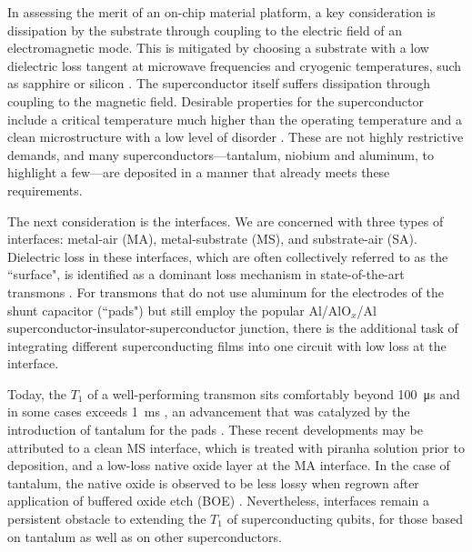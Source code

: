 \documentclass[
    reprint,
    superscriptaddress,
    amsmath,amssymb,
    aps,
    prb,
    floatfix,
]{revtex4-2}
\begin{document}
In assessing the merit of an on-chip material platform, a key consideration is dissipation by the substrate through coupling to the electric field of an electromagnetic mode. This is mitigated by choosing a substrate with a low dielectric loss tangent at microwave frequencies and cryogenic temperatures, such as sapphire \cite{creedon2011,read2023,ganjam2024} or silicon \cite{oconnell2008,checchin2022,zhang2024,bland2025}. The superconductor itself suffers dissipation through coupling to the magnetic field. Desirable properties for the superconductor include a critical temperature much higher than the operating temperature \cite{mattis1958} and a clean microstructure with a low level of disorder \cite{grunhaupt2018,amin2022,gupta2025}. These are not highly restrictive demands, and many superconductors---tantalum, niobium and aluminum, to highlight a few---are deposited in a manner that already meets these requirements.

The next consideration is the interfaces. We are concerned with three types of interfaces: metal-air (MA), metal-substrate (MS), and substrate-air (SA). Dielectric loss in these interfaces, which are often collectively referred to as the ``surface", is identified as a dominant loss mechanism in state-of-the-art transmons \cite{wang2015,crowley2023,ganjam2024,bland2025}. For transmons that do not use aluminum for the electrodes of the shunt capacitor (``pads") but still employ the popular Al/AlO$_x$/Al superconductor-insulator-superconductor junction, there is the additional task of integrating different superconducting films into one circuit with low loss at the interface.

Today, the $T_1$ of a well-performing transmon sits comfortably beyond \SI{100}{\micro\second} and in some cases exceeds \SI{1}{\milli\second} \cite{place2021,wang2022,deng2023,bal2024,ganjam2024,kono2024,biznarova2024,tuokkola2025,bland2025}, an advancement that was catalyzed by the introduction of tantalum for the pads \cite{place2021}. These recent developments may be attributed to a clean MS interface, which is treated with piranha solution prior to deposition, and a low-loss native oxide layer at the MA interface. In the case of tantalum, the native oxide is observed to be less lossy when regrown after application of buffered oxide etch (BOE) \cite{mclellan2023,crowley2023}. Nevertheless, interfaces remain a persistent obstacle to extending the $T_1$ of superconducting qubits, for those based on tantalum as well as on other superconductors.
\end{document}
